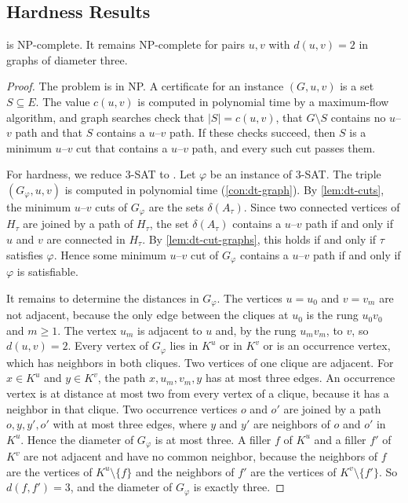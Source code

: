 \subsection{Hardness Results}
\label{sec:dt-results}

\begin{theorem}
\label{thm:dt-hardness}
\PathInMinCut{} is NP-complete.
It remains NP-complete for pairs $u, v$ with $d(u, v) = 2$ in graphs of diameter three.
\end{theorem}

\begin{proof}
The problem is in NP.
A certificate for an instance $(G, u, v)$ is a set $S \subseteq E$.
The value $c(u, v)$ is computed in polynomial time by a maximum-flow algorithm, and graph searches check that $|S| = c(u, v)$, that $G \setminus S$ contains no $u$--$v$ path and that $S$ contains a $u$--$v$ path.
If these checks succeed, then $S$ is a minimum $u$--$v$ cut that contains a $u$--$v$ path, and every such cut passes them.

For hardness, we reduce 3-SAT to \PathInMinCut{}.
Let $\varphi$ be an instance of 3-SAT.
The triple $(G_\varphi, u, v)$ is computed in polynomial time (\cref{con:dt-graph}).
By \cref{lem:dt-cuts}, the minimum $u$--$v$ cuts of $G_\varphi$ are the sets $\delta(A_\tau)$.
Since two connected vertices of $H_\tau$ are joined by a path of $H_\tau$, the set $\delta(A_\tau)$ contains a $u$--$v$ path if and only if $u$ and $v$ are connected in $H_\tau$.
By \cref{lem:dt-cut-graphs}, this holds if and only if $\tau$ satisfies $\varphi$.
Hence some minimum $u$--$v$ cut of $G_\varphi$ contains a $u$--$v$ path if and only if $\varphi$ is satisfiable.

It remains to determine the distances in $G_\varphi$.
The vertices $u = u_0$ and $v = v_m$ are not adjacent, because the only edge between the cliques at $u_0$ is the rung $u_0 v_0$ and $m \geq 1$.
The vertex $u_m$ is adjacent to $u$ and, by the rung $u_m v_m$, to $v$, so $d(u, v) = 2$.
Every vertex of $G_\varphi$ lies in $K^u$ or in $K^v$ or is an occurrence vertex, which has neighbors in both cliques.
Two vertices of one clique are adjacent.
For $x \in K^u$ and $y \in K^v$, the path $x, u_m, v_m, y$ has at most three edges.
An occurrence vertex is at distance at most two from every vertex of a clique, because it has a neighbor in that clique.
Two occurrence vertices $o$ and $o'$ are joined by a path $o, y, y', o'$ with at most three edges, where $y$ and $y'$ are neighbors of $o$ and $o'$ in $K^u$.
Hence the diameter of $G_\varphi$ is at most three.
A filler $f$ of $K^u$ and a filler $f'$ of $K^v$ are not adjacent and have no common neighbor, because the neighbors of $f$ are the vertices of $K^u \setminus \{f\}$ and the neighbors of $f'$ are the vertices of $K^v \setminus \{f'\}$.
So $d(f, f') = 3$, and the diameter of $G_\varphi$ is exactly three.
\end{proof}

